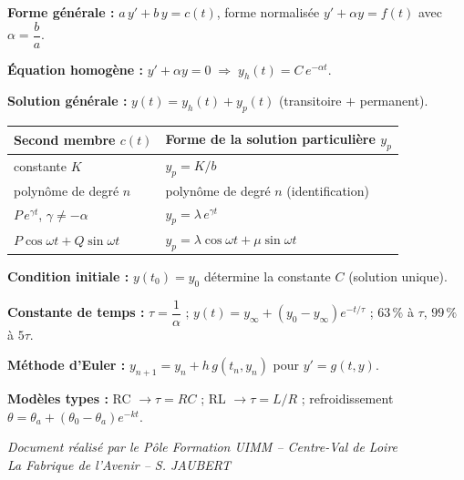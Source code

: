 \documentclass[a4paper,11pt]{article}
\begin{document}
\begin{tcolorbox}[colback=uimmlightblue, colframe=uimmblue, title={\textbf{Formulaire des équations différentielles du 1\textsuperscript{er} ordre}}, fonttitle=\large\bfseries\sffamily, coltitle=white, boxrule=1.5pt, arc=5pt]

\textbf{Forme générale :} $a\,y' + b\,y = c(t)$, \; forme normalisée $y' + \alpha y = f(t)$ avec $\alpha = \dfrac{b}{a}$.

\vspace{6pt}
\textbf{Équation homogène :} $y' + \alpha y = 0 \;\Rightarrow\; y_h(t) = C\,e^{-\alpha t}$.

\vspace{6pt}
\textbf{Solution générale :} $y(t) = y_h(t) + y_p(t)$ (transitoire $+$ permanent).

\vspace{4pt}
\renewcommand{\arraystretch}{1.6}
\begin{tabular}{|>{\raggedright\arraybackslash}m{5.2cm}|>{\raggedright\arraybackslash}m{9cm}|}
\hline
\rowcolor{uimmblue!20}
\textbf{Second membre $c(t)$} & \textbf{Forme de la solution particulière $y_p$} \\
\hline
constante $K$ & $y_p = K/b$ \\
\hline
polynôme de degré $n$ & polynôme de degré $n$ (identification) \\
\hline
$P\,e^{\gamma t}$, $\gamma \neq -\alpha$ & $y_p = \lambda\,e^{\gamma t}$ \\
\hline
$P\cos\omega t + Q\sin\omega t$ & $y_p = \lambda\cos\omega t + \mu\sin\omega t$ \\
\hline
\end{tabular}

\vspace{8pt}
\textbf{Condition initiale :} $y(t_0) = y_0$ détermine la constante $C$ (solution unique).

\vspace{6pt}
\textbf{Constante de temps :} $\tau = \dfrac{1}{\alpha}$ ; \; $y(t) = y_\infty + (y_0 - y_\infty)e^{-t/\tau}$ ; \; $63\,\%$ à $\tau$, $99\,\%$ à $5\tau$.

\vspace{6pt}
\textbf{Méthode d'Euler :} $y_{n+1} = y_n + h\,g(t_n, y_n)$ pour $y' = g(t,y)$.

\vspace{4pt}
\textbf{Modèles types :} RC $\to \tau = RC$ ; \; RL $\to \tau = L/R$ ; \; refroidissement $\theta = \theta_a + (\theta_0-\theta_a)e^{-kt}$.
\end{tcolorbox}

\vfill
\begin{center}
\color{uimmgray}\small
\textit{Document réalisé par le Pôle Formation UIMM -- Centre-Val de Loire}\\
\textit{La Fabrique de l'Avenir -- S. JAUBERT}
\end{center}
\end{document}

